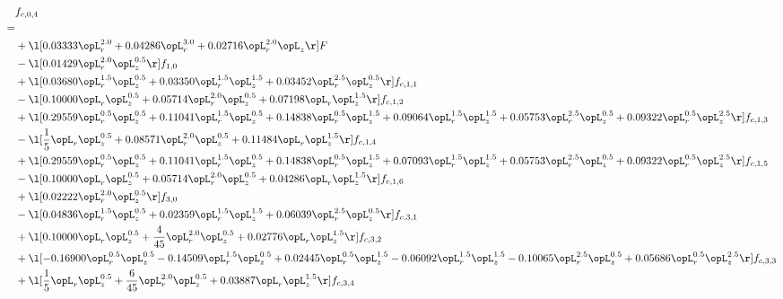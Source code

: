 \begin{alignat}{2} 
\label{eq:f_04_2} 
& f_{c,0,4} \nonumber \\ 
 = \\ 
& + \l[  0.03333 \opL_r^{2.0} +  0.04286 \opL_r^{3.0} +  0.02716 \opL_r^{2.0} \opL_z  \r] F \nonumber \\ 
& - \l[  0.01429 \opL_r^{2.0} \opL_z^{0.5}  \r] f_{1,0} \nonumber \\ 
& + \l[  0.03680 \opL_r^{1.5} \opL_z^{0.5} +  0.03350 \opL_r^{1.5} \opL_z^{1.5} +  0.03452 \opL_r^{2.5} \opL_z^{0.5}  \r] f_{c,1,1} \nonumber \\ 
& - \l[  0.10000 \opL_r \opL_z^{0.5} +  0.05714 \opL_r^{2.0} \opL_z^{0.5} +  0.07198 \opL_r \opL_z^{1.5}  \r] f_{c,1,2} \nonumber \\ 
& + \l[  0.29559 \opL_r^{0.5} \opL_z^{0.5} +  0.11041 \opL_r^{1.5} \opL_z^{0.5} +  0.14838 \opL_r^{0.5} \opL_z^{1.5} +  0.09064 \opL_r^{1.5} \opL_z^{1.5} +  0.05753 \opL_r^{2.5} \opL_z^{0.5} +  0.09322 \opL_r^{0.5} \opL_z^{2.5}  \r] f_{c,1,3} \nonumber \\ 
& - \l[ \frac{1}{5} \opL_r \opL_z^{0.5} +  0.08571 \opL_r^{2.0} \opL_z^{0.5} +  0.11484 \opL_r \opL_z^{1.5}  \r] f_{c,1,4} \nonumber \\ 
& + \l[  0.29559 \opL_r^{0.5} \opL_z^{0.5} +  0.11041 \opL_r^{1.5} \opL_z^{0.5} +  0.14838 \opL_r^{0.5} \opL_z^{1.5} +  0.07093 \opL_r^{1.5} \opL_z^{1.5} +  0.05753 \opL_r^{2.5} \opL_z^{0.5} +  0.09322 \opL_r^{0.5} \opL_z^{2.5}  \r] f_{c,1,5} \nonumber \\ 
& - \l[  0.10000 \opL_r \opL_z^{0.5} +  0.05714 \opL_r^{2.0} \opL_z^{0.5} +  0.04286 \opL_r \opL_z^{1.5}  \r] f_{c,1,6} \nonumber \\ 
& + \l[  0.02222 \opL_r^{2.0} \opL_z^{0.5}  \r] f_{3,0} \nonumber \\ 
& - \l[  0.04836 \opL_r^{1.5} \opL_z^{0.5} +  0.02359 \opL_r^{1.5} \opL_z^{1.5} +  0.06039 \opL_r^{2.5} \opL_z^{0.5}  \r] f_{c,3,1} \nonumber \\ 
& + \l[  0.10000 \opL_r \opL_z^{0.5} + \frac{4}{45} \opL_r^{2.0} \opL_z^{0.5} +  0.02776 \opL_r \opL_z^{1.5}  \r] f_{c,3,2} \nonumber \\ 
& + \l[  -0.16900 \opL_r^{0.5} \opL_z^{0.5}   -0.14509 \opL_r^{1.5} \opL_z^{0.5} +  0.02445 \opL_r^{0.5} \opL_z^{1.5}   -0.06092 \opL_r^{1.5} \opL_z^{1.5}   -0.10065 \opL_r^{2.5} \opL_z^{0.5} +  0.05686 \opL_r^{0.5} \opL_z^{2.5}  \r] f_{c,3,3} \nonumber \\ 
& + \l[ \frac{1}{5} \opL_r \opL_z^{0.5} + \frac{6}{45} \opL_r^{2.0} \opL_z^{0.5} +  0.03887 \opL_r \opL_z^{1.5}  \r] f_{c,3,4} \nonumber \\ 

\end{alignat}
